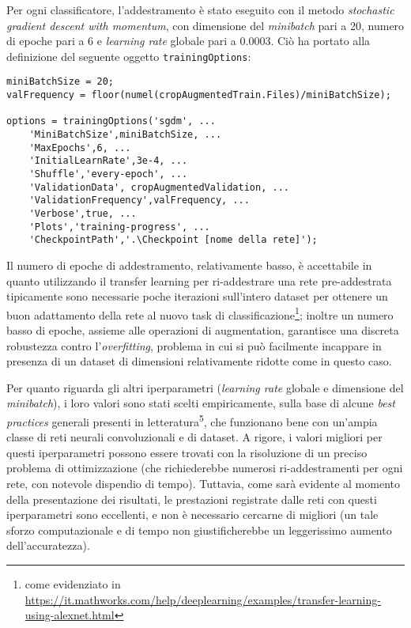 Per ogni classificatore, l’addestramento è stato eseguito con il metodo \textit{stochastic gradient descent with momentum}, con dimensione del \textit{minibatch} pari a 20, numero di epoche pari a 6 e \textit{learning rate} globale pari a 0.0003.
Ciò ha portato alla definizione del seguente oggetto \verb|trainingOptions|:

\begin{verbatim}
miniBatchSize = 20;
valFrequency = floor(numel(cropAugmentedTrain.Files)/miniBatchSize);

options = trainingOptions('sgdm', ...
    'MiniBatchSize',miniBatchSize, ...
    'MaxEpochs',6, ...
    'InitialLearnRate',3e-4, ...
    'Shuffle','every-epoch', ...
    'ValidationData', cropAugmentedValidation, ...
    'ValidationFrequency',valFrequency, ...
    'Verbose',true, ...
    'Plots','training-progress', ...
    'CheckpointPath','.\Checkpoint [nome della rete]');
\end{verbatim}

Il numero di epoche di addestramento, relativamente basso, è accettabile in quanto utilizzando il transfer learning per ri-addestrare una rete pre-addestrata tipicamente sono necessarie poche iterazioni sull'intero dataset per ottenere un buon adattamento della rete al nuovo task di classificazione\footnote{come evidenziato in \url{https://it.mathworks.com/help/deeplearning/examples/transfer-learning-using-alexnet.html}}; inoltre un numero basso di epoche, assieme alle operazioni di augmentation, garantisce una discreta robustezza contro l'\textit{overfitting}, problema in cui si può facilmente incappare in presenza di un dataset di dimensioni relativamente ridotte come in questo caso.

Per quanto riguarda gli altri iperparametri (\textit{learning rate} globale e dimensione del \textit{minibatch}), i loro valori sono stati scelti empiricamente, sulla base di alcune \textit{best practices} generali presenti in letteratura\textsuperscript{5}, che funzionano bene con un'ampia classe di reti neurali convoluzionali e di dataset.
A rigore, i valori migliori per questi iperparametri possono essere trovati con la risoluzione di un preciso problema di ottimizzazione (che richiederebbe numerosi ri-addestramenti per ogni rete, con notevole dispendio di tempo). Tuttavia, come sarà evidente al momento della presentazione dei risultati, le prestazioni registrate dalle reti con questi iperparametri sono eccellenti, e non è necessario cercarne di migliori (un tale sforzo computazionale e di tempo non giustificherebbe un leggerissimo aumento dell'accuratezza).\\

